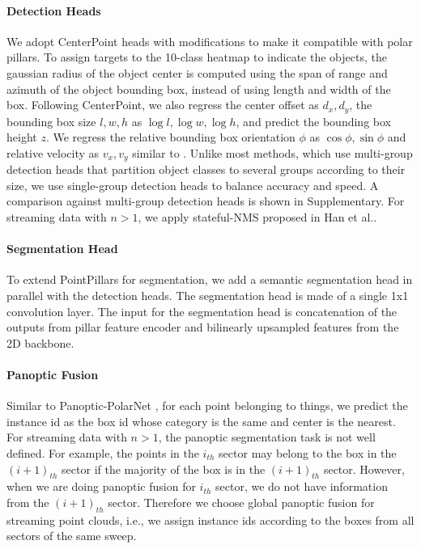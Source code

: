 \documentclass{article}
\begin{document}
\vspace{-3.5mm}\paragraph{Detection Heads}\label{det} We adopt CenterPoint \cite{yin2020center} heads with modifications to make it compatible with polar pillars. To assign targets to the 10-class heatmap to indicate the objects, the gaussian radius of the object center is computed using the span of range and azimuth of the object bounding box, instead of using length and width of the box. Following CenterPoint, we also regress the center offset as $d_x, d_y$, the bounding box size $l,w,h$ as $\log l, \log w, \log h$, and predict the bounding box height $z$. We regress the relative bounding box orientation $\phi$ as $\cos \phi, \sin \phi$ and relative velocity as $v_x, v_y$ similar to \cite{rapoport2020s}. Unlike most methods, which use multi-group detection heads that partition object classes to several groups according to their size, we use single-group detection heads to balance accuracy and speed. A comparison against multi-group detection heads is shown in Supplementary. 
For streaming data with $n > 1$, we apply stateful-NMS proposed in Han et al.\cite{han2020streaming}.










\vspace{-3.5mm}\paragraph{Segmentation Head} To extend PointPillars for segmentation, we add a semantic segmentation head in parallel with the detection heads. The segmentation head is made of a single 1x1 convolution layer. The input for the segmentation head is concatenation of the outputs from pillar feature encoder and bilinearly upsampled features from the 2D backbone.

\vspace{-3.5mm}\paragraph{Panoptic Fusion}\label{fusion} Similar to Panoptic-PolarNet \cite{zhou2021panoptic}, for each point belonging to things, we predict the instance id as the box id whose category is the same and center is the nearest. For streaming data with $n > 1$, the panoptic segmentation task is not well defined. For example, the points in the $i_{th}$ sector may belong to the box in the $(i+1)_{th}$ sector if the majority of the box is in the $(i+1)_{th}$ sector. However, when we are doing panoptic fusion for $i_{th}$ sector, we do not have information from the $(i+1)_{th}$ sector. Therefore we choose global panoptic fusion for streaming point clouds, i.e., we assign instance ids according to the boxes from all sectors of the same sweep. 
\end{document}
